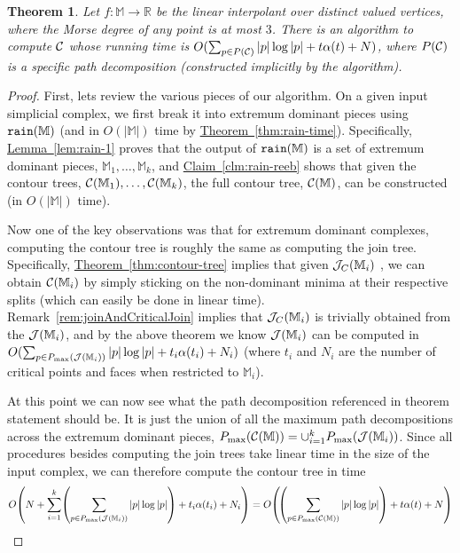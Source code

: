 \documentclass[11pt]{article}
\newtheorem{theorem}{Theorem}[section]
\theoremstyle{definition}
\newcommand{\cC}{{\cal C}}
\newcommand{\cJ}{{\cal J}}
\newcommand{\MM}{\mathbb{M}}
\newcommand{\RR}{\mathbb{R}}
\newcommand{\Clm}[1]{\hyperref[clm:#1]{Claim~\ref*{clm:#1}}} %
\newcommand{\Thm}[1]{\hyperref[thm:#1]{Theorem~\ref*{thm:#1}}} %
\newcommand{\Lem}[1]{\hyperref[lem:#1]{Lemma~\ref*{lem:#1}}} %
\newcommand{\jc}{\cJ_C}
\newcommand{\pmax}{P_{\max}}
\newcommand{\rain}{{\tt rain}}
\newcommand{\pth}[2][\!]{#1\left({#2}\right)}
\begin{document}
\begin{theorem}
Let $f:\MM \to \RR$ be the linear interpolant over distinct valued vertices, where the Morse degree of any point is at most $3$. 
There is an algorithm to compute $\cC$ whose running time is $O(\sum_{p \in P(\cC)} |p|\log |p| + t\alpha(t) + N)$,
where $P(\cC)$ is a specific path decomposition (constructed implicitly by the algorithm).
\end{theorem}
\begin{proof}
First, lets review the various pieces of our algorithm. 
On a given input simplicial complex, we first break it into extremum dominant pieces using $\rain(\MM)$ (and in $O(|\MM|)$ time by \Thm{rain-time}).  
Specifically, \Lem{rain-1} proves that the output of $\rain(\MM)$ is a set of extremum dominant pieces, 
$\MM_1, \dots, \MM_k$, and \Clm{rain-reeb} shows that given the contour trees, $\cC(\MM_1), \dots, \cC(\MM_k)$, 
the full contour tree, $\cC(\MM)$, can be constructed (in $O(|\MM|)$ time).

Now one of the key observations was that for extremum dominant complexes, computing the contour tree is roughly the same as 
computing the join tree.  Specifically, \Thm{contour-tree} implies that given $\jc(\MM_i)$ , 
we can obtain $\cC(\MM_i)$ by simply sticking on the non-dominant minima at their respective splits (which can easily be done in linear time).
Remark~\ref{rem:joinAndCriticalJoin} implies that $\jc(\MM_i)$ is trivially obtained from the $\cJ(\MM_i)$, and 
 by the above theorem we know $\cJ(\MM_i)$ can be computed in $O(\sum_{p \in \pmax(\cJ(\MM_i))} |p|\log |p| + t_i\alpha(t_i) + N_i)$
(where $t_i$ and $N_i$ are the number of critical points and faces when restricted to $\MM_i$).

At this point we can now see what the path decomposition referenced in theorem statement should be.  It is just the union of all the maximum 
path decompositions across the extremum dominant pieces, $\pmax(\cC(\MM)) = \cup_{i=1}^k \pmax(\cJ(\MM_i))$.
Since all procedures besides computing the join trees take linear time in the size of the input complex, we can therefore 
compute the contour tree in time
\[
O\pth{N+ \sum_{i=1}^k \pth{\sum_{p \in \pmax(\cJ(\MM_i))} |p|\log |p|} + t_i\alpha(t_i) + N_i}
=\break O\pth{\pth{\sum_{p \in \pmax(\cC(\MM))} |p|\log |p|} + t\alpha(t) + N}
\]




\end{proof}
\end{document}
